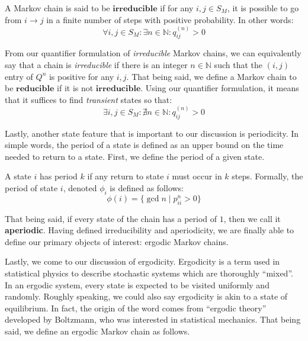 \begin{definition}[Reducibility] A Markov chain is said to be $\textbf{irreducible}$ if for any $i,j \in S_M$, it is possible to go from $i \to j$ in a finite number of steps with positive probability.
In other words:
$$\forall i,j \in S_M: \exists n \in \mathbb{N} : q_{ij}^{(n)} > 0$$
\end{definition}

From our quantifier formulation of \textit{irreducible} Markov chains,
we can equivalently say that a chain is  \textit{irreducible} if there is an integer $n \in \mathbb{N}$ such that the $(i,j)$ entry of $Q^n$ is positive for any $i,j$.
That being said, we define a Markov chain to be $\textbf{reducible}$ if it is not $\textbf{irreducible}$.
Using our quantifier formulation, it means that it suffices to find \textit{transient} states so that:
$$\exists i,j \in S_M: \nexists n \in \mathbb{N} : q_{ij}^{(n)} > 0$$

Lastly, another state feature that is important to our discussion is periodicity.
In simple words, the period of a state is defined as an upper bound on the time needed to return to a state.
First, we define the period of a given state.

\begin{definition}[Period]
A state $i$ has period $k$ if any return to state $i$ must occur in $k$ steps.
Formally, the period of state $i$, denoted $\phi_i$ is defined as follows:
$$\phi(i) = \{\gcd{n} \mid p_{ii}^n > 0\}$$
\end{definition}

That being said, if every state of the chain has a period of $1$, then we call it \textbf{aperiodic}.
Having defined irreducibility and aperiodicity, we are finally able to define our primary objects of interest: ergodic Markov chains.

\newpage
{}

Lastly, we come to our discussion of ergodicity. Ergodicity is a term used in statistical physics to describe stochastic systems which are thoroughly ``mixed''.
In an ergodic system, every state is expected to be visited uniformly and randomly. Roughly speaking, we could also say ergodicity is akin to a state of equilibrium.
In fact, the origin of the word comes from ``ergodic theory'' developed by Boltzmann, who was interested in statistical mechanics.
That being said, we define an ergodic Markov chain as follows.

